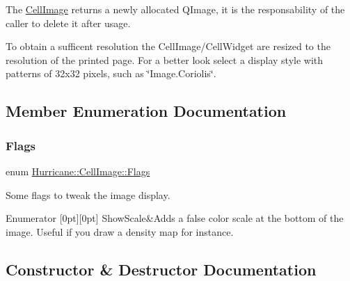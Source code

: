 The \mbox{\hyperlink{classHurricane_1_1CellImage}{Cell\+Image}} returns a newly allocated Q\+Image, it is the responsability of the caller to delete it after usage.

To obtain a sufficent resolution the Cell\+Image/\+Cell\+Widget are resized to the resolution of the printed page. For a better look select a display style with patterns of 32x32 pixels, such as {\ttfamily \char`\"{}\+Image.\+Coriolis\char`\"{}}. 

\subsection{Member Enumeration Documentation}
\mbox{\label{classHurricane_1_1CellImage_a5836ca863f8bc47702ca040ac8897703}} 
\subsubsection{\texorpdfstring{Flags}{Flags}}
{\footnotesize\ttfamily enum \mbox{\hyperlink{classHurricane_1_1CellImage_a5836ca863f8bc47702ca040ac8897703}{Hurricane\+::\+Cell\+Image\+::\+Flags}}}

Some flags to tweak the image display. \begin{DoxyEnumFields}{Enumerator}
[0pt][0pt]{}\mbox{\label{classHurricane_1_1CellImage_a5836ca863f8bc47702ca040ac8897703a5463e21b19fa7d390bfe239121195879}} 
Show\+Scale&Adds a false color scale at the bottom of the image. Useful if you draw a density map for instance. \\
\hline

\end{DoxyEnumFields}


\subsection{Constructor \& Destructor Documentation}
\mbox{\label{classHurricane_1_1CellImage_a3f73f1a3a90d4625a5e0b31711affc34}} 
